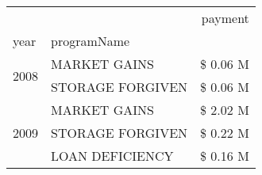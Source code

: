 \begin{tabular}{llr}
\toprule
 &  & payment \\
year & programName &  \\
\midrule
\multirow[t]{2}{*}{2008} & MARKET GAINS & \$ 0.06 M \\
 & STORAGE FORGIVEN & \$ 0.06 M \\
\cline{1-3}
\multirow[t]{3}{*}{2009} & MARKET GAINS & \$ 2.02 M \\
 & STORAGE FORGIVEN & \$ 0.22 M \\
 & LOAN DEFICIENCY & \$ 0.16 M \\
\cline{1-3}
\bottomrule
\end{tabular}
